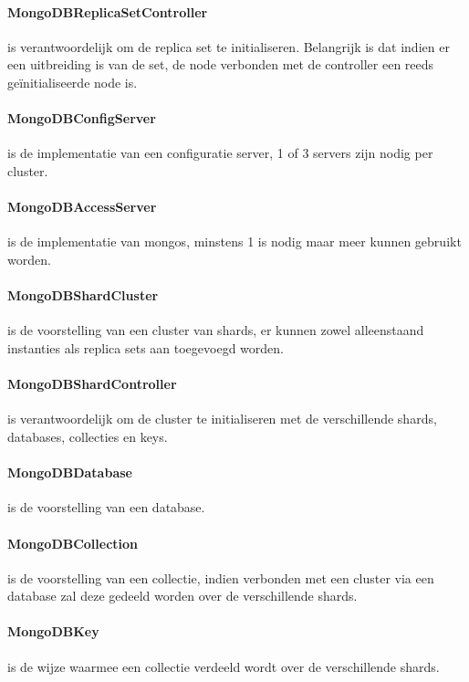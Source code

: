 	\paragraph{MongoDBReplicaSetController} is verantwoordelijk om de replica set te initialiseren. Belangrijk is dat indien er een uitbreiding is van de set, de node verbonden met de controller een reeds geïnitialiseerde node is.  
	\paragraph{MongoDBConfigServer} is de implementatie van een configuratie server, 1 of 3 servers zijn nodig per cluster. 
	\paragraph{MongoDBAccessServer} is de implementatie van mongos, minstens 1 is nodig maar meer kunnen gebruikt worden.
	\paragraph{MongoDBShardCluster} is de voorstelling van een cluster van shards, er kunnen zowel alleenstaand instanties als replica sets aan toegevoegd worden. 
	\paragraph{MongoDBShardController} is verantwoordelijk om de cluster te initialiseren met de verschillende shards, databases, collecties en keys. 
	\paragraph{MongoDBDatabase} is de voorstelling van een database.
	\paragraph{MongoDBCollection} is de voorstelling van een collectie, indien verbonden met een cluster via een database zal deze gedeeld worden over de verschillende shards. 
	\paragraph{MongoDBKey} is de wijze waarmee een collectie verdeeld wordt over de verschillende shards. 

